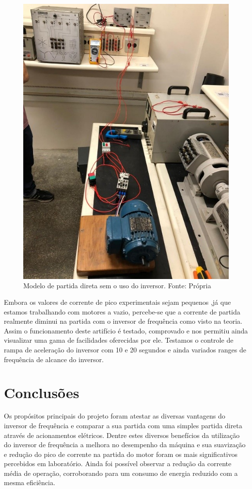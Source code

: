 \documentclass[a4paper, 12pt,oneside, english, brazil]{abntex2}
\begin{document}
\begin{figure}[H]
    \centering
    \includegraphics[scale=1.0]{partidadireta.jpg}
    \caption{Modelo de partida direta sem o uso do inversor. Fonte: Própria}
    \label{direct}
\end{figure}

Embora os valores de corrente de pico experimentais sejam pequenos ,já que estamos trabalhando com motores a vazio, percebe-se que a corrente de partida realmente diminui na partida com o inversor de frequência como visto na teoria. Assim o funcionamento deste artifício é testado, comprovado e nos permitiu ainda visualizar uma gama de facilidades oferecidas por ele. Testamos o controle de rampa de aceleração do inversor com 10 e 20 segundos e ainda variados ranges de frequência de alcance do inversor.  


\chapter{Conclusões}
Os propósitos principais do projeto foram atestar as diversas vantagens do inversor de frequência e comparar a sua partida com uma simples partida direta através de acionamentos elétricos. Dentre estes diversos benefícios da utilização do inversor de frequência a melhora no desempenho da máquina e sua suavização e redução do pico de corrente na partida do motor foram os mais significativos percebidos em laboratório. Ainda foi possível observar a redução da corrente média de operação, corroborando para um consumo de energia reduzido com a mesma eficiência.
\end{document}

